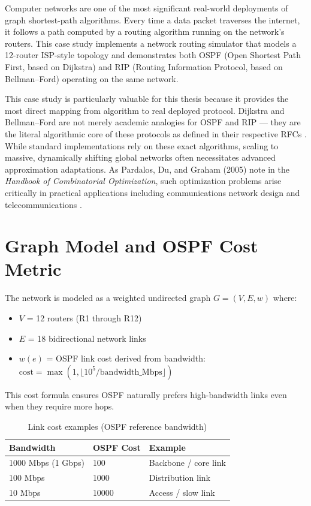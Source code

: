 \documentclass[12pt, a4paper, oneside]{report}
\theoremstyle{definition}
\begin{document}
Computer networks are one of the most significant real-world deployments of graph shortest-path algorithms. Every time a data packet traverses the internet, it follows a path computed by a routing algorithm running on the network's routers. This case study implements a network routing simulator that models a 12-router ISP-style topology and demonstrates both OSPF (Open Shortest Path First, based on Dijkstra) and RIP (Routing Information Protocol, based on Bellman–Ford) operating on the same network.

This case study is particularly valuable for this thesis because it provides the most direct mapping from algorithm to real deployed protocol. Dijkstra and Bellman–Ford are not merely academic analogies for OSPF and RIP — they are the literal algorithmic core of these protocols as defined in their respective RFCs \citep{moy1998, malkin1998}. While standard implementations rely on these exact algorithms, scaling to massive, dynamically shifting global networks often necessitates advanced approximation adaptations. As Pardalos, Du, and Graham (2005) note in the \textit{Handbook of Combinatorial Optimization}, such optimization problems arise critically in practical applications including communications network design and telecommunications \citep{pardalos2005}.

\section{Graph Model and OSPF Cost Metric}

The network is modeled as a weighted undirected graph $G = (V, E, w)$ where:
\begin{itemize}
    \item $V$ = 12 routers (R1 through R12)
    \item $E$ = 18 bidirectional network links
    \item $w(e)$ = OSPF link cost derived from bandwidth: $\text{cost} = \max(1, \lfloor 10^5 / \text{bandwidth\_Mbps} \rfloor)$
\end{itemize}

This cost formula ensures OSPF naturally prefers high-bandwidth links even when they require more hops.

\begin{table}[H]
\centering
\caption{Link cost examples (OSPF reference bandwidth)}
\label{tab:ospf_costs}
\begin{tabular}{lll}
\toprule
\textbf{Bandwidth} & \textbf{OSPF Cost} & \textbf{Example} \\
\midrule
1000 Mbps (1 Gbps) & 100     & Backbone / core link \\
100 Mbps           & 1000    & Distribution link \\
10 Mbps            & 10000   & Access / slow link \\
\bottomrule
\end{tabular}
\end{table}
\end{document}
